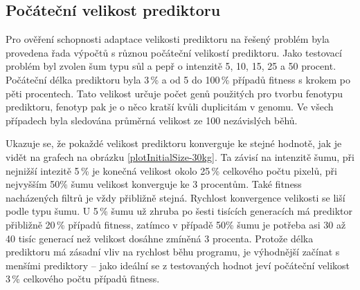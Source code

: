 \subsection{Počáteční velikost prediktoru}



Pro ověření schopnosti adaptace velikosti prediktoru na řešený problém byla provedena řada výpočtů s různou počáteční velikostí prediktoru. Jako testovací problém byl zvolen šum typu sůl a pepř o intenzitě 5, 10, 15, 25 a 50 procent. Počáteční délka prediktoru byla 3\,\% a od 5 do 100\,\% případů fitness s krokem po pěti procentech. Tato velikost určuje počet genů použitých pro tvorbu fenotypu prediktoru, fenotyp pak je o něco kratší kvůli duplicitám v genomu. Ve všech případech byla sledována průměrná velikost ze 100 nezávislých běhů.

Ukazuje se, že pokaždé velikost prediktoru konverguje ke stejné hodnotě, jak je vidět na grafech na obrázku \ref{plotInitialSize-30kg}. Ta závisí na intenzitě šumu, při nejnižší intezitě 5\,\% je konečná velikost okolo 25\,\% celkového počtu pixelů, při nejvyšším 50\% šumu velikost konverguje ke 3 procentům. Také fitness nacházených filtrů je vždy přibližně stejná. Rychlost konvergence velikosti se liší podle typu šumu. U 5\,\% šumu už zhruba po šesti tisících generacích má prediktor přibližně 20\,\% případů fitness, zatímco v případě 50\% šumu je potřeba asi 30 až 40 tisíc generací než velikost dosáhne zmíněná 3 procenta. Protože délka prediktoru má zásadní vliv na rychlost běhu programu, je výhodnější začínat s menšími prediktory -- jako ideální se z testovaných hodnot jeví počáteční velikost 3\,\% celkového počtu případů fitness.

